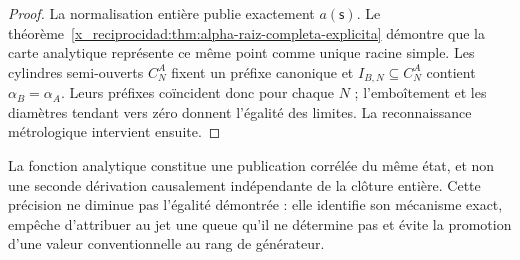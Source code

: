 \begin{proof}
La normalisation entière publie exactement \(a(\mathsf s)\). Le
théorème~\ref{x_reciprocidad:thm:alpha-raiz-completa-explicita} démontre que la carte
analytique représente ce même point comme unique racine simple. Les
cylindres semi-ouverts \(C_N^A\) fixent un préfixe canonique et
\(I_{B,N}\subseteq C_N^A\) contient \(\alpha_B=\alpha_A\). Leurs
préfixes coïncident donc pour chaque \(N\) ; l'emboîtement et les diamètres tendant vers
zéro donnent l'égalité des limites. La reconnaissance
métrologique intervient ensuite.
\end{proof}

La fonction analytique constitue une publication corrélée du même
état, et non une seconde dérivation causalement indépendante de la clôture
entière. Cette précision ne diminue pas l'égalité démontrée : elle identifie son
mécanisme exact, empêche d'attribuer au jet une queue qu'il ne détermine pas et évite la
promotion d'une valeur conventionnelle au rang de générateur.




